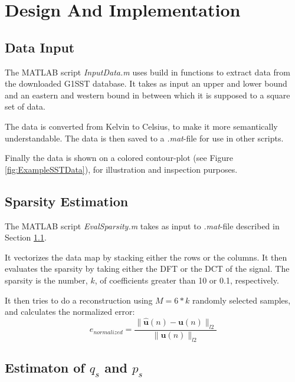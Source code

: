 \documentclass[Main]{subfiles}
\begin{document}
\section{Design And Implementation} %
\label{sec:design_and_implementation}

	\subsection{Data Input} %
	\label{sub:data_input}

		The MATLAB script \emph{InputData.m} uses build in functions to extract data from the downloaded G1SST database.
		It takes as input an upper and lower bound and an eastern and western bound in between which it is supposed to a square set of data.

		The data is converted from Kelvin to Celsius, to make it more semantically understandable.
		The data is then saved to a \emph{.mat}-file for use in other scripts.

		Finally the data is shown on a colored contour-plot (see Figure \ref{fig:ExampleSSTData}), for illustration and inspection purposes.

	

	\subsection{Sparsity Estimation} %
	\label{sub:sparsity_estimation}

		The MATLAB script \emph{EvalSparsity.m} takes as input to \emph{.mat}-file described in Section \ref{sub:data_input}.

		It vectorizes the data map by stacking either the rows or the columns.
		It then evaluates the sparsity by taking either the DFT or the DCT of the signal.
		The sparsity is the number, $k$, of coefficients greater than 10 or 0.1, respectively.

		It then tries to do a reconstruction using $M = 6*k$ randomly selected samples, and calculates the normalized error:
		\begin{equation}
			e_{normalized} = \frac
				{\|\mathbf{\hat{u}}(n) - \mathbf{u}(n)\|_{l2}}
				{\|\mathbf{u}(n)\|_{l2}}
		\end{equation}




	

	\subsection{Estimaton of $q_s$ and $p_s$} %
	\label{sub:estimaton_of_q_s_and_p_s_}
	
\end{document}
